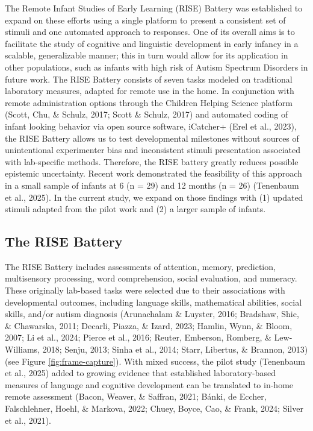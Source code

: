 \documentclass[
  english,
  man,floatsintext]{apa6}
\begin{document}
The Remote Infant Studies of Early Learning (RISE) Battery was established to expand on these efforts using a single platform to present a consistent set of stimuli and one automated approach to responses.
One of its overall aims is to facilitate the study of cognitive and linguistic development in early infancy in a scalable, generalizable manner; this in turn would allow for its application in other populations, such as infants with high risk of Autism Spectrum Disorders in future work.
The RISE Battery consists of seven tasks modeled on traditional laboratory measures, adapted for remote use in the home.
In conjunction with remote administration options through the Children Helping Science platform (Scott, Chu, \& Schulz, 2017; Scott \& Schulz, 2017) and automated coding of infant looking behavior via open source software, iCatcher+ (Erel et al., 2023), the RISE Battery allows us to test developmental milestones without sources of unintentional experimenter bias and inconsistent stimuli presentation associated with lab-specific methods.
Therefore, the RISE battery greatly reduces possible epistemic uncertainty.
Recent work demonstrated the feasibility of this approach in a small sample of infants at 6 (n = 29) and 12 months (n = 26) (Tenenbaum et al., 2025).
In the current study, we expand on those findings with (1) updated stimuli adapted from the pilot work and (2) a larger sample of infants.

\subsection{The RISE Battery}\label{the-rise-battery}

The RISE Battery includes assessments of attention, memory, prediction, multisensory processing, word comprehension, social evaluation, and numeracy.
These originally lab-based tasks were selected due to their associations with developmental outcomes, including language skills, mathematical abilities, social skills, and/or autism diagnosis (Arunachalam \& Luyster, 2016; Bradshaw, Shic, \& Chawarska, 2011; Decarli, Piazza, \& Izard, 2023; Hamlin, Wynn, \& Bloom, 2007; Li et al., 2024; Pierce et al., 2016; Reuter, Emberson, Romberg, \& Lew-Williams, 2018; Senju, 2013; Sinha et al., 2014; Starr, Libertus, \& Brannon, 2013) (see Figure \ref{fig:frame-capture}).
With mixed success, the pilot study (Tenenbaum et al., 2025) added to growing evidence that established laboratory-based measures of language and cognitive development can be translated to in-home remote assessment (Bacon, Weaver, \& Saffran, 2021; {Bánki, de Eccher, Falschlehner, Hoehl, \& Markova}, 2022; Chuey, Boyce, Cao, \& Frank, 2024; Silver et al., 2021).
\end{document}
